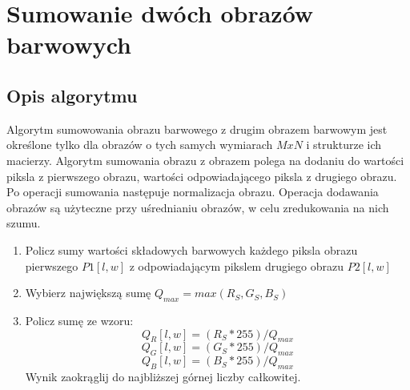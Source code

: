\documentclass[a4paper,12pt, titlepage]{report}
\begin{document}
\section{Sumowanie dwóch obrazów barwowych}
\subsection*{Opis algorytmu}
\par Algorytm sumowowania obrazu barwowego z drugim obrazem barwowym jest określone tylko dla obrazów o tych samych wymiarach \(MxN\) i strukturze ich macierzy. Algorytm sumowania obrazu z obrazem polega na dodaniu do wartości piksla z  pierwszego obrazu, wartości odpowiadającego piksla z drugiego obrazu. Po operacji sumowania następuje normalizacja obrazu. Operacja dodawania obrazów są użyteczne przy uśrednianiu obrazów, w celu zredukowania na nich szumu.
\begin{enumerate}
\item Policz sumy wartości składowych barwowych każdego piksla obrazu pierwszego \(P1[l,w]\) z odpowiadającym pikslem drugiego obrazu \(P2[l,w]\)
\item Wybierz największą sumę \(Q_{max}=max(R_{S},G_{S},B_{S})\)
\item Policz sumę ze wzoru: \[Q_{R}[l,w]=(R_{S}*255)/Q_{max}\]\[Q_{G}[l,w]=(G_{S}*255)/Q_{max}\]\[Q_{B}[l,w]=(B_{S}*255)/Q_{max}\]Wynik zaokrąglij do najbliższej górnej liczby całkowitej.
\end{enumerate}
\end{document}
